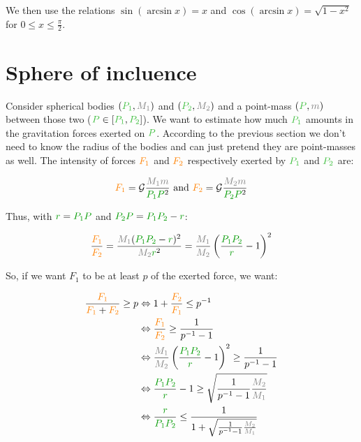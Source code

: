 We then use the relations $\sin(\arcsin x) = x$ and $\cos(\arcsin x) =
\sqrt{1 - x^2}$ for $0 \leq x \leq \frac {\pi} 2$.



\section{Sphere of incluence}

Consider spherical bodies $(\posit{P_1}, \mass{M_1})$ and $(\posit{P_2},
\mass{M_2})$ and a point-mass $(\posit{P}, \mass{m})$ between those
two ($\posit{P} \in [\posit{P_1}, \posit{P_2}]$). We want to estimate
how much $\posit{P_1}$ amounts in the gravitation forces exerted on
$\posit{P}$. According to the previous section we don't need to know
the radius of the bodies and can just pretend they are point-masses as
well. The intensity of forces $\textcolor{orange}{F_1}$ and $\textcolor{orange}{F_2}$ respectively
exerted by $\posit{P_1}$ and $\posit{P_2}$ are:

\[
\force{F_1} = \mathcal G \frac {\mass{M_1} \mass{m}} {\dist{P_1 P}^2}
\text{ and }
\force{F_2} = \mathcal G \frac {\mass{M_2} \mass{m}} {\dist{P_2 P}^2}
\]

Thus, with $\dist{r} = \dist{P_1 P}$ and $\dist{P_2 P} = \dist{P_1 P_2}
- \dist{r}$:

\[
\frac {\force{F_1}} {\force{F_2}}
= \frac {\mass{M_1} (\dist{P_1 P_2} - \dist{r})^2} {\mass{M_2} \dist{r}^2}
= \frac {\mass{M_1}} {\mass{M_2}} \left(\frac {\dist{P_1 P_2}} {\dist{r}} - 1\right)^2
\]

So, if we want $F_1$ to be at least $p$ of the exerted force, we want:

\begin{align*}
\frac {\force{F_1}} {\force{F_1} + \force{F_2}} \ge p
& \Leftrightarrow 1 + \frac {\force{F_2}} {\force{F_1}} \le p^{-1} \\
& \Leftrightarrow \frac {\force{F_1}} {\force{F_2}} \ge \frac 1 {p^{-1} - 1} \\
& \Leftrightarrow \frac {\mass{M_1}} {\mass{M_2}} \left(\frac {\dist{P_1 P_2}} {\dist{r}} - 1\right)^2 \ge \frac 1 {p^{-1} - 1} \\
& \Leftrightarrow \frac {\dist{P_1 P_2}} {\dist{r}} - 1 \ge \sqrt{\frac 1 {p^{-1} - 1} \frac {\mass{M_2}} {\mass{M_1}}} \\
& \Leftrightarrow \frac {\dist{r}} {\dist{P_1 P_2}} \le \frac 1 {1 + \sqrt{\frac 1 {p^{-1} - 1} \frac {\mass{M_2}} {\mass{M_1}}}} \\
\end{align*}

